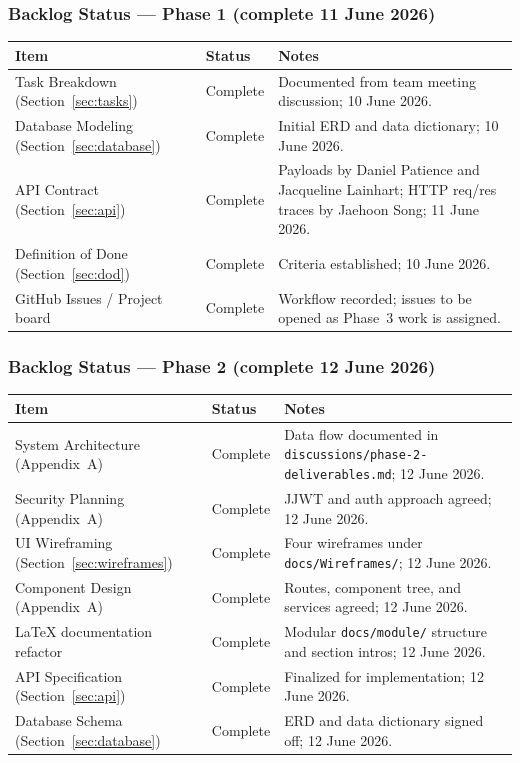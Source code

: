 \subsubsection{Backlog Status --- Phase 1 (complete 11 June 2026)}
\begin{tabularx}{\textwidth}{@{} l l X @{}}
  \toprule
  \textbf{Item} & \textbf{Status} & \textbf{Notes} \\
  \midrule
  Task Breakdown (Section~\ref{sec:tasks})       & Complete & Documented from team meeting discussion; 10 June 2026. \\
  Database Modeling (Section~\ref{sec:database}) & Complete & Initial ERD and data dictionary; 10 June 2026. \\
  API Contract (Section~\ref{sec:api})          & Complete & Payloads by Daniel Patience and Jacqueline Lainhart; HTTP req/res traces by Jaehoon Song; 11 June 2026. \\
  Definition of Done (Section~\ref{sec:dod})     & Complete & Criteria established; 10 June 2026. \\
  GitHub Issues / Project board                  & Complete & Workflow recorded; issues to be opened as Phase~3 work is assigned. \\
  \bottomrule
\end{tabularx}

\subsubsection{Backlog Status --- Phase 2 (complete 12 June 2026)}
\begin{tabularx}{\textwidth}{@{} l l X @{}}
  \toprule
  \textbf{Item} & \textbf{Status} & \textbf{Notes} \\
  \midrule
  System Architecture (Appendix~A) & Complete & Data flow documented in \texttt{discussions/phase-2-deliverables.md}; 12 June 2026. \\
  Security Planning (Appendix~A) & Complete & JJWT and auth approach agreed; 12 June 2026. \\
  UI Wireframing (Section~\ref{sec:wireframes})   & Complete & Four wireframes under \texttt{docs/Wireframes/}; 12 June 2026. \\
  Component Design (Appendix~A) & Complete & Routes, component tree, and services agreed; 12 June 2026. \\
  LaTeX documentation refactor                   & Complete & Modular \texttt{docs/module/} structure and section intros; 12 June 2026. \\
  API Specification (Section~\ref{sec:api})       & Complete & Finalized for implementation; 12 June 2026. \\
  Database Schema (Section~\ref{sec:database})   & Complete & ERD and data dictionary signed off; 12 June 2026. \\
  \bottomrule
\end{tabularx}

